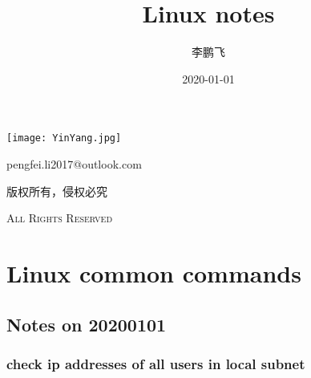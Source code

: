 \documentclass[UTF8,fancyhdr,a4paper]{ctexart}
\title{Linux notes}
\author{李鹏飞}
\date{2020-01-01}
\begin{document}
\begin{titlepage}
\maketitle
{}
\centering
\vspace{10cm}
\texttt{[image: YinYang.jpg]}\par
\vspace{1cm}
{\huge pengfei.li2017@outlook.com}\par
\vspace{0.5cm}
{\small 版权所有，侵权必究}\par
\vspace{0.5cm}
{\scshape \small All Rights Reserved}
\end{titlepage}

\tableofcontents
{}%
\clearpage
\listoffigures
{}
\clearpage
\listoftables
{}
\clearpage

\newpage
{}
\section{Linux common commands}

\subsection{Notes on 20200101}

\subsubsection{check ip addresses of all users in local subnet}
\end{document}
